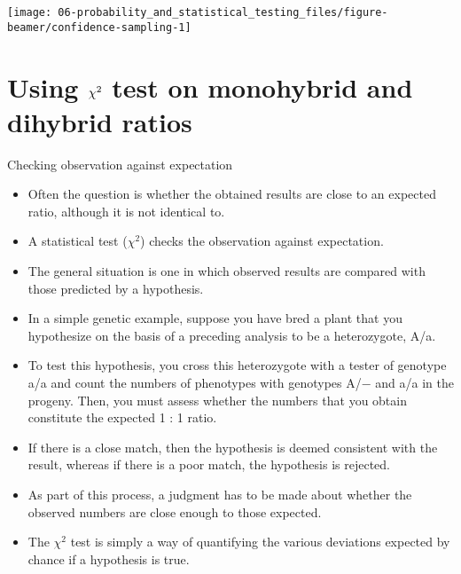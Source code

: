 \documentclass[11pt,ignorenonframetext,aspectratio=169]{beamer}
\providecommand{\tightlist}{%
  \setlength{\itemsep}{0pt}\setlength{\parskip}{0pt}}
\begin{document}
\begin{frame}{}
\protect\hypertarget{section-1}{}
\begin{center}\texttt{[image: 06-probability\_and\_statistical\_testing\_files/figure-beamer/confidence-sampling-1]} \end{center}
\end{frame}

\hypertarget{using-large-chi2-test-on-monohybrid-and-dihybrid-ratios}{%
\section{\texorpdfstring{Using \(\Large \chi^2\) test on monohybrid and
dihybrid
ratios}{Using \textbackslash Large \textbackslash chi\^{}2 test on monohybrid and dihybrid ratios}}\label{using-large-chi2-test-on-monohybrid-and-dihybrid-ratios}}

\begin{frame}{Checking observation against expectation}
\protect\hypertarget{checking-observation-against-expectation}{}
\small

\begin{itemize}
\tightlist
\item
  Often the question is whether the obtained results are close to an
  expected ratio, although it is not identical to.
\item
  A statistical test (\(\chi^2\)) checks the observation against
  expectation.
\item
  The general situation is one in which observed results are compared
  with those predicted by a hypothesis.
\item
  In a simple genetic example, suppose you have bred a plant that you
  hypothesize on the basis of a preceding analysis to be a heterozygote,
  A/a.
\item
  To test this hypothesis, you cross this heterozygote with a tester of
  genotype a/a and count the numbers of phenotypes with genotypes A/−
  and a/a in the progeny. Then, you must assess whether the numbers that
  you obtain constitute the expected 1 : 1 ratio.
\item
  If there is a close match, then the hypothesis is deemed consistent
  with the result, whereas if there is a poor match, the hypothesis is
  rejected.
\item
  As part of this process, a judgment has to be made about whether the
  observed numbers are close enough to those expected.
\item
  The \(\chi^2\) test is simply a way of quantifying the various
  deviations expected by chance if a hypothesis is true.
\end{itemize}
\end{frame}
\end{document}
